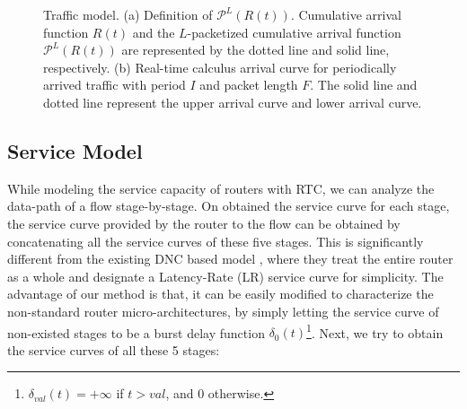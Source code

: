 \documentclass[10pt,journal]{IEEEtran}
\begin{document}
\begin{figure}
  \caption{Traffic model. (a) Definition of $\mathcal{P}^L(R(t))$. Cumulative arrival function $R(t)$ and the $L$-packetized cumulative arrival function $\mathcal{P}^L(R(t))$ are represented by the dotted line and solid line, respectively. (b) Real-time calculus arrival curve for periodically arrived traffic with period $I$ and packet length $F$. The solid line and dotted line represent the upper arrival curve and lower arrival curve.}\label{ac}
\end{figure}

\subsection{Service Model}\label{router}
While modeling the service capacity of routers with RTC, we can analyze the data-path of a flow stage-by-stage. On obtained the service curve for each stage, the service curve provided by the router to the flow can be obtained by concatenating all the service curves of these five stages. This is significantly different from the existing DNC based model \cite{qian2009analysis,Qian489900}, where they treat the entire router as a whole and designate a Latency-Rate (LR) service curve for simplicity. The advantage of our method is that, it can be easily modified to characterize the non-standard router micro-architectures, by simply letting the service curve of non-existed stages to be a burst delay function $\delta_0(t)$\footnote{$\delta_{val}(t)=+\infty$ if $t>val$, and 0 otherwise.}. Next, we try to obtain the service curves of all these 5 stages:
\end{document}
